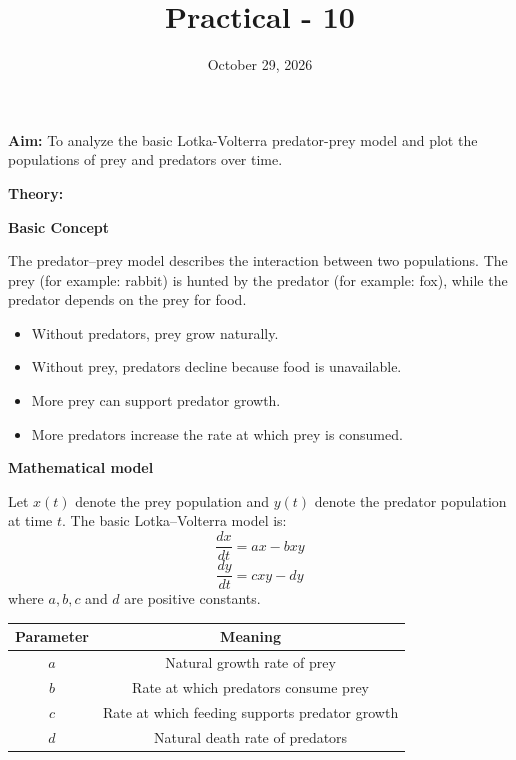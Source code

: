 \documentclass{article}
\title{\textbf{{Practical - 10}}}
\author{}
\date{October 29, 2026}
\begin{document}
\maketitle

\noindent
\textbf{\large{Aim:}} To analyze the basic Lotka-Volterra predator-prey model and plot the populations of prey and predators over time.

\vspace{1em}
\noindent
\textbf{\large{Theory:}}

\vspace{0.5em}
\noindent
\textbf{Basic Concept}

\noindent
The predator–prey model describes the interaction between two populations. The prey (for example: rabbit) is hunted by the predator (for example: fox), while the predator depends on the prey for food.
\begin{itemize}
    \item Without predators, prey grow naturally.
    \item Without prey, predators decline because food is unavailable.
    \item More prey can support predator growth.
    \item More predators increase the rate at which prey is consumed.
\end{itemize}

\vspace{0.5em}
\noindent
\textbf{Mathematical model}

\noindent
Let $x(t)$ denote the prey population and $y(t)$ denote the predator population at time $t$. The basic Lotka–Volterra model is:
\[\frac{dx}{dt} = ax - bxy\]
\[\frac{dy}{dt} = cxy - dy\]
where $a, b, c$ and $d$ are positive constants.

\begin{table}[h]
    \centering
    \begin{tabular}{|c|c|}
    \hline
    \textbf{Parameter} & \textbf{Meaning} \\
    \hline
    \textbf{$a$} & Natural growth rate of prey \\
    \hline
    \textbf{$b$} & Rate at which predators consume prey \\
    \hline
    \textbf{$c$} & Rate at which feeding supports predator growth \\
    \hline
    \textbf{$d$} & Natural death rate of predators \\
    \hline
    \end{tabular}
\end{table}
\end{document}
